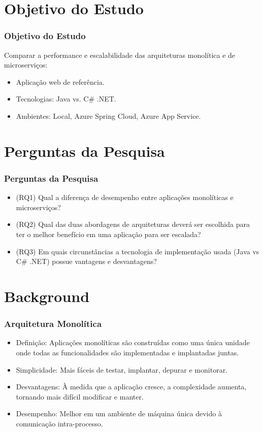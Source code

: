 \documentclass{beamer}
\begin{document}
\section{Objetivo do Estudo}

\begin{frame}
\frametitle{Objetivo do Estudo}
Comparar a performance e escalabilidade das arquiteturas monolítica e de microserviços:
\begin{itemize}
    \item Aplicação web de referência.
    \item Tecnologias: Java vs. C\# .NET.
    \item Ambientes: Local, Azure Spring Cloud, Azure App Service.
\end{itemize}
\end{frame}

\section{Perguntas da Pesquisa}

\begin{frame}
\frametitle{Perguntas da Pesquisa}
\begin{itemize}
    \item (RQ1) Qual a diferença de desempenho entre aplicações monolíticas e microserviços?
    \item (RQ2) Qual das duas abordagens de arquiteturas deverá ser escolhida para ter o melhor benefício em uma aplicação para ser escalada?
    \item (RQ3) Em quais circunstâncias a tecnologia de implementação usada (Java vs C\# .NET) possue vantagens e desvantagens?
\end{itemize}
\end{frame}

\section{Background}

\begin{frame}
\frametitle{Arquitetura Monolítica}

\begin{itemize}
    \item Definição: Aplicações monolíticas são construídas como uma única unidade onde todas as funcionalidades são implementadas e implantadas juntas.
    \item Simplicidade: Mais fáceis de testar, implantar, depurar e monitorar.
    \item Desvantagens: À medida que a aplicação cresce, a complexidade aumenta, tornando mais difícil modificar e manter.
    \item Desempenho: Melhor em um ambiente de máquina única devido à comunicação intra-processo.
\end{itemize}
\end{frame}
\end{document}
